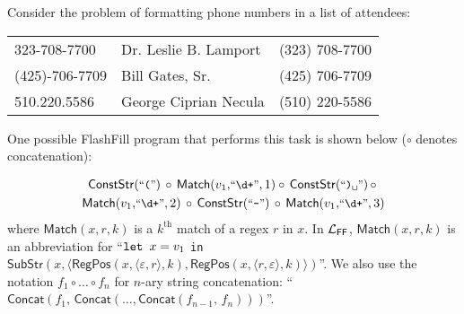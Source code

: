 \begin{example}
    \label{ex:background:ff}
    Consider the problem of formatting phone numbers in a list of attendees:
    \begin{center}
        \small
        \begin{tabular}{lll}
            \toprule
            \midrule
            323-708-7700 & Dr. Leslie B. Lamport & (323) 708-7700 \\
            (425)-706-7709 & Bill Gates, Sr. & (425) 706-7709 \\
            510.220.5586 & George Ciprian Necula & (510) 220-5586 \\
            \bottomrule
        \end{tabular}
    \end{center}
    One possible FlashFill program that performs this task is shown below ($\circ$ denotes concatenation):

    \begin{multline*}
        \mathsf{ConstStr}(\stringliteral{(})
        \, \circ\, \mathsf{Match}(v_1,\! \stringliteral{\textbackslash d+}, 1) \circ\,
        \mathsf{ConstStr}(\stringliteral{)\textvisiblespace})
        \,\circ\, \\ \mathsf{Match}(v_1,\! \stringliteral{\textbackslash d+}, 2) \,\circ\,
        \mathsf{ConstStr}(\stringliteral{-}) \,\circ\, \mathsf{Match}(v_1,\! \stringliteral{\textbackslash d+}, 3)
    \end{multline*}
    where $\mathsf{Match}(x, r, k)$ is a $k^{\text{th}}$ match of a regex $r$ in $x$.
    In $\mathcal{L}_{\mathsf{FF}}$, $\mathsf{Match}(x, r, k)$ is an abbreviation for
    ``$\text{\ttfamily let } x = v_1$ \texttt{in } $\mathsf{SubStr}(x,\langle \mathsf{RegPos}(x, \langle \varepsilon, r\rangle, k),
    \mathsf{RegPos}(x, \langle r, \varepsilon\rangle, k)\rangle)$''. \linebreak
    We also use the notation $f_1 \circ \dots \circ f_n$ for $n$-ary string concatenation:
    ``$\mathsf{Concat}(f_1,\, \mathsf{Concat}(\dots, \mathsf{Concat}(f_{n-1},\, f_n)))$''.
\end{example}
